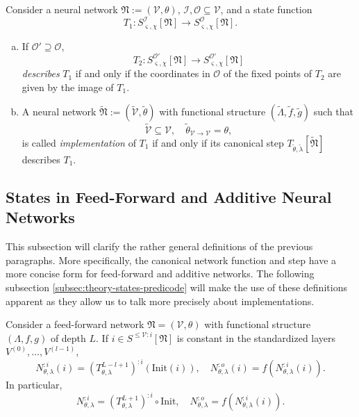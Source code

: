 \documentclass[a4paper,11pt]{report}
\newcommand{\const}{\varsigma} %
\newcommand{\var}{\chi} %
\newcommand{\In}{\text{Init}}
\begin{document}
\begin{Def}[Implementations]
Consider a neural network $\mathfrak{N}:=(\mathcal{V},\theta)$, $\mathcal{I},\mathcal{O}\subseteq\mathcal{V}$, and a state function
\[
T_1:S^{\mathcal{I}}_{\const,\var}[\mathfrak{N}]\to S^{\mathcal{O}}_{\const,\var}[\mathfrak{N}].
\]
\begin{enumerate}[a)]
\item
If $\mathcal{O}'\supseteq\mathcal{O}$, 
\[
T_2:S^{\mathcal{O}'}_{\const,\var}[\mathfrak{N}]\to S^{\mathcal{O}'}_{\const,\var}[\mathfrak{N}]
\]
\emph{describes} $T_1$ if and only if the coordinates in $\mathcal{O}$ of the fixed points of $T_2$ are given by the image of $T_1$.
\item
A neural network $\tilde{\mathfrak{N}}:=(\tilde{\mathcal{V}},\tilde{\theta})$ with functional structure $(\tilde{\Lambda},\tilde{f},\tilde{g})$ such that
\[
\tilde{\mathcal{V}}\subseteq\mathcal{V},
\quad
\tilde{\theta}_{\mathcal{V}\to\mathcal{V}}=\theta,
\]
is called \emph{implementation} of $T_1$ if and only if its canonical step $T_{\tilde{\theta},\tilde{\lambda}}[\tilde{\mathfrak{N}}]$ describes $T_1$.
\end{enumerate}
\end{Def}

\subsection{States in Feed-Forward and Additive Neural Networks}\label{subsec:theory-states-add}

\begin{Par}
This subsection will clarify the rather general definitions of the previous paragraphs. More specifically, the canonical network function and step have a more concise form for feed-forward and additive networks. The following subsection \ref{subsec:theory-states-predicode} will make the use of these definitions apparent as they allow us to talk more precisely about implementations.
\end{Par}

\begin{Pro}
Consider a feed-forward network $\mathfrak{N}=(\mathcal{V},\theta)$ with functional structure $(\Lambda,f,g)$ of depth $L$.
If $i\in S^{\le\mathcal{V}:i}[\mathfrak{N}]$ is constant in the standardized layers $V^{(0)},\dotsc,V^{(l-1)}$, 
\begin{equation}
N_{\theta,\lambda}^{:i}(i)=\left(T_{\theta,\lambda}^{L-l+1}\right)^{:i}\left(\In(i)\right),
\quad
N_{\theta,\lambda}^{:o}(i)=f\left(N_{\theta,\lambda}^{:i}(i)\right).
\end{equation}
In particular, 
\begin{equation}
N_{\theta,\lambda}^{:i}=\left(T_{\theta,\lambda}^{L+1}\right)^{:i}\circ\In, 
\quad
N_{\theta,\lambda}^{:o}=f\left(N_{\theta,\lambda}^{:i}(i)\right).
\end{equation}
\end{Pro}
\end{document}
